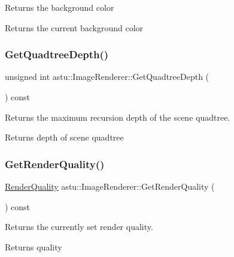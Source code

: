 Returns the background color

\begin{DoxyReturn}{Returns}
the current background color 
\end{DoxyReturn}
\mbox{\label{classastu_1_1ImageRenderer_ad08e4f2afcf5076aa6745557914f77ce}} 
\subsubsection{\texorpdfstring{Get\+Quadtree\+Depth()}{GetQuadtreeDepth()}}
{\footnotesize\ttfamily unsigned int astu\+::\+Image\+Renderer\+::\+Get\+Quadtree\+Depth (\begin{DoxyParamCaption}{ }\end{DoxyParamCaption}) const\hspace{0.3cm}{\ttfamily [inline]}}

Returns the maximum recursion depth of the scene quadtree.

\begin{DoxyReturn}{Returns}
depth of scene quadtree 
\end{DoxyReturn}
\mbox{\label{classastu_1_1ImageRenderer_a7f3f1cc8129dd8e40dea73e7f1333769}} 
\subsubsection{\texorpdfstring{Get\+Render\+Quality()}{GetRenderQuality()}}
{\footnotesize\ttfamily \hyperlink{group__gfx__group_gac3b4955f341cea44f53f8446d734cd54}{Render\+Quality} astu\+::\+Image\+Renderer\+::\+Get\+Render\+Quality (\begin{DoxyParamCaption}{ }\end{DoxyParamCaption}) const\hspace{0.3cm}{\ttfamily [inline]}}

Returns the currently set render quality.

\begin{DoxyReturn}{Returns}
quality 
\end{DoxyReturn}
\mbox{\label{classastu_1_1ImageRenderer_a55172edcac396d7840da655697d57e28}} 
